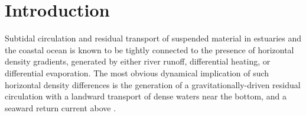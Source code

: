 % 

\section{Introduction\label{sec:intro}}
Subtidal circulation and residual transport of suspended material in
estuaries and the coastal ocean is known to be tightly connected to
the presence of horizontal density gradients, generated by either
river runoff, differential heating, or differential evaporation. The
most obvious dynamical implication of such horizontal density
differences is the generation of a gravitationally-driven residual
circulation with a landward transport of dense waters near the bottom,
and a seaward return current above
\citep{Pritchard1952,MacCreadyGeyer2010}.

